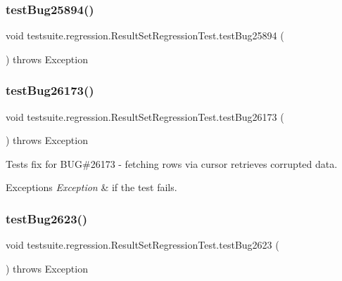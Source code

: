 \subsubsection{\texorpdfstring{test\+Bug25894()}{testBug25894()}}
{\footnotesize\ttfamily void testsuite.\+regression.\+Result\+Set\+Regression\+Test.\+test\+Bug25894 (\begin{DoxyParamCaption}{ }\end{DoxyParamCaption}) throws Exception}

\mbox{\label{classtestsuite_1_1regression_1_1_result_set_regression_test_afa0bbccee8e4bffb0576ef3c0cd096f0}} 
\subsubsection{\texorpdfstring{test\+Bug26173()}{testBug26173()}}
{\footnotesize\ttfamily void testsuite.\+regression.\+Result\+Set\+Regression\+Test.\+test\+Bug26173 (\begin{DoxyParamCaption}{ }\end{DoxyParamCaption}) throws Exception}

Tests fix for B\+UG\#26173 -\/ fetching rows via cursor retrieves corrupted data.


\begin{DoxyExceptions}{Exceptions}
{\em Exception} & if the test fails. \\
\hline
\end{DoxyExceptions}
\mbox{\label{classtestsuite_1_1regression_1_1_result_set_regression_test_a5cf13074c3f54ef463c169be1423a3ba}} 
\subsubsection{\texorpdfstring{test\+Bug2623()}{testBug2623()}}
{\footnotesize\ttfamily void testsuite.\+regression.\+Result\+Set\+Regression\+Test.\+test\+Bug2623 (\begin{DoxyParamCaption}{ }\end{DoxyParamCaption}) throws Exception}

